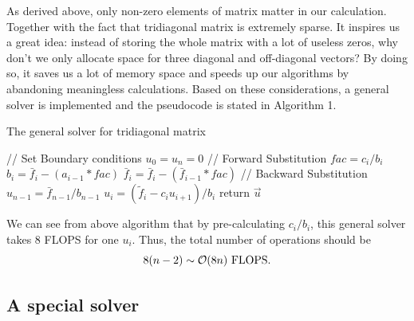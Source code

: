 \documentclass[12pt]{article}
\begin{document}
As derived above, only non-zero elements of matrix matter in our calculation. Together with the fact that tridiagonal matrix is extremely sparse. It inspires us a great idea: instead of storing the whole matrix with a lot of useless zeros, why don't we only allocate space for three diagonal and off-diagonal vectors? By doing so, it saves us a lot of memory space and speeds up our algorithms by abandoning meaningless calculations. Based on these considerations, a general solver is implemented and the pseudocode is stated in Algorithm 1.
\begin{algorithm}
\caption{The general solver for tridiagonal matrix}
// Set Boundary conditions\;
$u_0 = u_{n} = 0$\;
// Forward Substitution\;
{
  $fac = c_i/b_i$\;
  $b_i = \bar{f}_i - (a_{i-1}*fac)$\;
  $\bar{f}_i = \bar{f}_i - (\bar{f}_{i-1}*fac)$\;
}
// Backward Substitution\;
$u_{n-1}=\bar{f}_{n-1}/b_{n-1}$\; 
{
  $u_i = (\tilde{f}_i - c_{i}u_{i+1})/b_i$\;
}
return $\vec{u}$\;
\end{algorithm}

We can see from above algorithm that by pre-calculating $c_i/b_i$, this general solver takes 8 FLOPS for one $u_i$. Thus, the total number of operations should be
\[
8(n-2) \sim \mathcal{O}(8n)\ \rm{FLOPS}.
\]


\subsection{A special solver}
\end{document}
